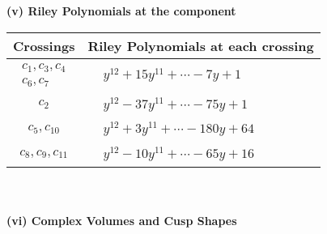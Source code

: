 \documentclass[1p]{elsarticle_modified}
\theoremstyle{definition}
\begin{document}
\newpage\renewcommand{\arraystretch}{1}
\flushleft \textbf{(v) Riley Polynomials at the component}\newline \\
\begin{tabular}{m{50pt}|m{274pt}}
Crossings & \hspace{64pt}Riley Polynomials at each crossing \\
\hline $$\begin{aligned}c_{1},c_{3},c_{4}\\c_{6},c_{7}\end{aligned}$$&$\begin{aligned}
&y^{12}+15 y^{11}+\cdots-7 y+1
\end{aligned}$\\
\hline $$\begin{aligned}c_{2}\end{aligned}$$&$\begin{aligned}
&y^{12}-37 y^{11}+\cdots-75 y+1
\end{aligned}$\\
\hline $$\begin{aligned}c_{5},c_{10}\end{aligned}$$&$\begin{aligned}
&y^{12}+3 y^{11}+\cdots-180 y+64
\end{aligned}$\\
\hline $$\begin{aligned}c_{8},c_{9},c_{11}\end{aligned}$$&$\begin{aligned}
&y^{12}-10 y^{11}+\cdots-65 y+16
\end{aligned}$\\
\hline
\end{tabular}\\~\\
\newpage\flushleft \textbf{(vi) Complex Volumes and Cusp Shapes}
\end{document}
